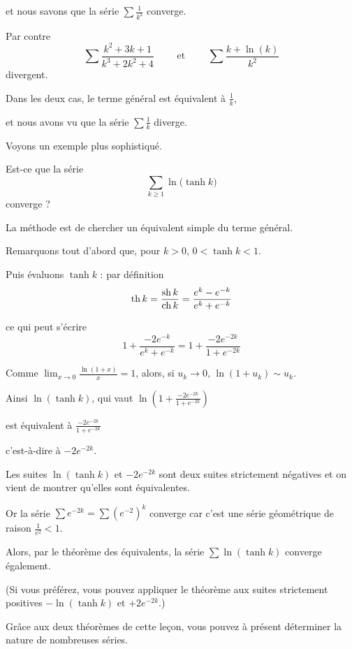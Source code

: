 \change
et nous savons que la série $\sum \frac{1}{k^2}$ converge.  

\change
Par contre
$$
\sum \frac{k^2+3k+1}{k^3+2k^2+4}
\qquad \text{ et } \qquad 
\sum \frac{k +\ln(k)}{k^2}$$
divergent.

\change
Dans les deux cas, le terme général est équivalent à $\frac{1}{k}$, 

\change
et nous avons vu que la série $\sum \frac{1}{k}$ diverge. 


\diapo

Voyons un exemple plus sophistiqué.

Est-ce que la série 
$$\sum_{k \ge 1}  \ln \big(\tanh k\big)$$
converge ?

La méthode est de chercher un équivalent simple du terme général.

\change
Remarquons tout d'abord que, pour $k >0$, $0<\tanh k<1$.

\change
Puis évaluons $\tanh k$ : par définition
$$\mathop{\mathrm{th}}\nolimits k = \frac{\mathop{\mathrm{sh}}\nolimits k}{\mathop{\mathrm{ch}}\nolimits k} = \frac{e^k-e^{-k}}{e^k+e^{-k}}$$

\change
ce qui peut s'écrire
$$ 1+  \frac{-2e^{-k}}{e^k+e^{-k}} = 1+\frac{-2e^{-2k}}{1+e^{-2k}}$$

\change
Comme $\lim_{x\to 0} \frac{\ln(1+x)}{x}=1$, alors, si $u_k \to 0$, $\ln(1+u_k) \sim u_k$. 
  
\change
Ainsi $\ln(\tanh k) $, qui vaut $ \ln\left( 1+\frac{-2e^{-2k}}{1+e^{-2k}} \right)$ 

\change
est équivalent à  $  \frac{-2e^{-2k}}{1+e^{-2k}}$

\change
c'est-à-dire à $-2e^{-2k}$.

\change
Les suites $\ln(\tanh k)$ et $-2e^{-2k}$ sont deux suites strictement négatives et on vient de montrer qu'elles sont équivalentes.

\change
Or la série $\sum e^{-2k}= \sum (e^{-2})^k$ converge car c'est une série géométrique de raison $\frac{1}{e^2} < 1$.

\change
Alors, par le théorème des équivalents, la série $\sum\ln(\tanh k)$ converge également. 

(Si vous préférez, vous pouvez appliquer le théorème aux suites strictement positives $-\ln(\tanh k)$ et $+2e^{-2k}$.)

\diapo

Grâce aux deux théorèmes de cette leçon, vous pouvez 
à présent déterminer la nature de nombreuses séries.



